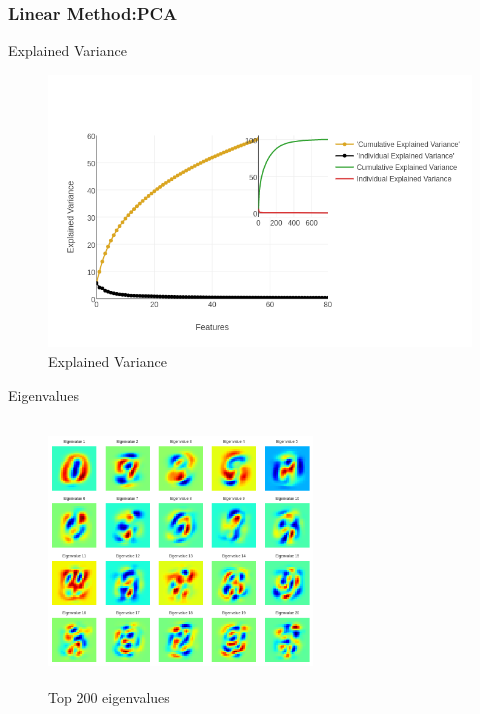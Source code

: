 \documentclass{beamer}
\theoremstyle{plain}
\theoremstyle{definition}
\theoremstyle{plain}
\theoremstyle{plain}
\begin{document}
\subsubsection{Linear Method:PCA}
\begin{frame}{Explained Variance}
\begin{figure}[h!]
\begin{center}
\includegraphics[width=\textwidth]{./Figures/pca_var.png}
\caption {Explained Variance}
\label{pca_var} 
\end{center}
\end{figure}
\end{frame}
\begin{frame}{Eigenvalues}
\begin{figure}[h!]
\begin{center}
\includegraphics[width= 7cm, height =7cm]{./Figures/pca_vis.png}
\caption {Top 200 eigenvalues}
\label{pca_vis} 
\end{center}
\end{figure}
\end{frame}
\end{document}
